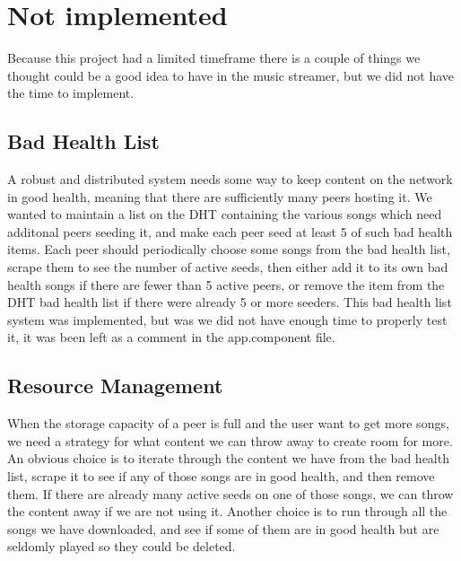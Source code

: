 

\section{Not implemented}
Because this project had a limited timeframe there is a couple of things
we thought could be a good idea to have in the
music streamer, but we did not have the time to implement.

\subsection{Bad Health List}
A robust and distributed system needs some way to keep content on the network in good health,
meaning that there are sufficiently many peers hosting it.
We wanted to maintain a list on the DHT containing the various songs which need additonal peers seeding it,
and make each peer seed at least 5 of such bad health items.
Each peer should periodically choose some songs from the bad health list,
scrape them to see the number of active seeds, 
then either add it to its own bad health songs if there are fewer than 5 active peers,
or remove the item from the DHT bad health list if there were already 5 or more seeders.
This bad health list system was implemented, but was we did not have enough time to properly test it,
it was been left as a comment in the app.component file.

\subsection{Resource Management}
When the storage capacity of a peer is full and the user want to get more songs,
we need a strategy for what content we can throw away to create room for more.
An obvious choice is to iterate through the content we have from the bad health list,
scrape it to see if any of those songs are in good health,
and then remove them.
If there are already many active seeds on one of those songs,
we can throw the content away if we are not using it.
Another choice is to run through all the songs we have downloaded,
and see if some of them are in good health but are seldomly played so they could be deleted.


